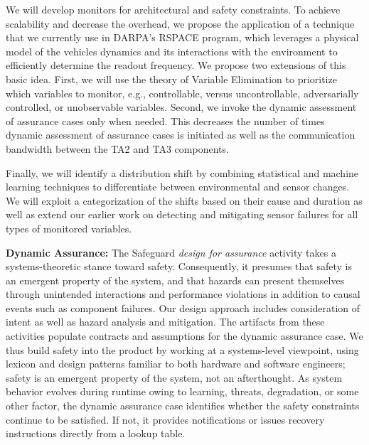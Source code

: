 \documentclass[12pt]{dod-blank}
\begin{document}
We will develop monitors for architectural and safety constraints. 
To achieve scalability and decrease the overhead, we propose the application of a technique that we currently use in DARPA's RSPACE program, which leverages a physical model of the vehicles dynamics and its interactions with the environment to efficiently determine the readout frequency. We propose two  extensions of this basic idea. First, we will use the theory of Variable Elimination to prioritize which variables to monitor, e.g., controllable, versus uncontrollable, adversarially controlled, or unobservable variables. Second, we invoke the dynamic assessment of assurance cases only when needed. This  decreases the number of times dynamic assessment of assurance cases is initiated as well as the communication bandwidth between the TA2 and TA3 components.

Finally, we will identify a distribution shift by combining statistical and machine learning techniques to differentiate between environmental and sensor changes. We will exploit a categorization of the shifts based on their cause and duration as well as extend our earlier work on detecting and mitigating sensor failures for all types of monitored variables.  

\textbf{Dynamic Assurance:} The Safeguard {\em design for assurance\/} activity takes a systems-theoretic stance toward safety.  Consequently, it presumes that safety is an emergent property of the system, and that hazards can present themselves through unintended interactions and performance violations in addition to causal events such as component failures.  Our design approach includes consideration of intent as well as hazard analysis and mitigation.  The artifacts from these activities populate contracts and assumptions for the dynamic assurance case.  
We thus build safety into the product by working at a systems-level viewpoint, using lexicon and design patterns familiar to both hardware and software engineers; safety is an emergent property of the system, not an afterthought.  
As system behavior evolves during runtime owing to learning, threats, degradation, or some other factor, the dynamic assurance case identifies whether the safety constraints continue to be satisfied.  If not, it provides notifications or issues recovery instructions directly from a lookup table.
\end{document}
